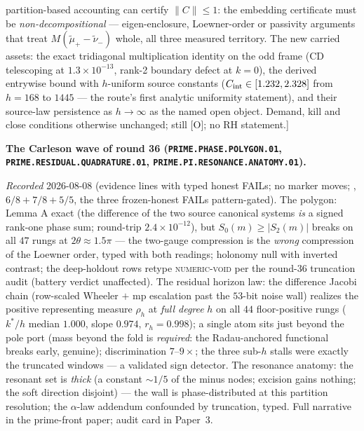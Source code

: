 {{partition-based accounting can certify $\|C\| \le 1$: the
embedding certificate must be \emph{non-decompositional} ---
eigen-enclosure, Loewner-order or passivity arguments that treat
$M(\tilde\mu_+ - \tilde\nu_-)$ whole, all three measured
territory.  The new carried assets: the exact tridiagonal
multiplication identity on the odd frame (CD telescoping at
$1.3\times10^{-13}$, rank-2 boundary defect at $k = 0$), the
derived entrywise bound with $h$-uniform source constants
($C_{\rm int} \in [1.232, 2.328]$ from $h = 168$ to $1445$ ---
the route's first analytic uniformity statement), and their
source-law persistence as $h \to \infty$ as the named open
object.  Demand, kill and close conditions otherwise unchanged;
still [O]; no RH statement.]}\par}


\par\smallskip\noindent\textbf{The Carleson wave of round 36
(\texttt{PRIME.PHASE.POLYGON.01},
\texttt{PRIME.RESIDUAL.\allowbreak QUADRATURE.01},
\texttt{PRIME.PI.RESONANCE.\allowbreak ANATOMY.01}).}
{\sloppy
\emph{Recorded} 2026-08-08 (evidence lines with typed honest
FAILs; no marker moves;
, $6/8 + 7/8 + 5/5$, the
three frozen-honest FAILs pattern-gated).  The polygon: Lemma A
exact (the difference of the two source canonical systems
\emph{is} a signed rank-one phase sum; round-trip
$2.4\times10^{-12}$), but $S_0(m) \ge |S_2(m)|$ breaks on all
$47$ rungs at $2\theta \approx 1.5\pi$ --- the two-gauge
compression is the \emph{wrong} compression of the Loewner
order, typed with both readings; holonomy null with inverted
contrast; the deep-holdout rows retype \textsc{numeric-void}
per the round-36 truncation audit (battery verdict unaffected).
The residual horizon law: the difference Jacobi chain
(row-scaled Wheeler $+$ mp escalation past the $53$-bit noise
wall) realizes the positive representing measure $\rho_h$ at
\emph{full degree} $h$ on all $44$ floor-positive rungs
($k^*/h$ median $1.000$, slope $0.974$, $r_h = 0.998$); a
single atom sits just beyond the pole port (mass beyond the
fold is \emph{required}: the Radau-anchored functional breaks
early, genuine); discrimination $7$--$9\times$; the three
sub-$h$ stalls were exactly the truncated windows --- a
validated sign detector.  The resonance anatomy: the resonant
set is \emph{thick} (a constant ${\sim}1/5$ of the minus nodes;
excision gains nothing; the soft direction disjoint) --- the
wall is phase-distributed at this partition resolution; the
$\alpha$-law addendum confounded by truncation, typed.  Full
narrative in the prime-front paper; audit card in
Paper~3.\par}


